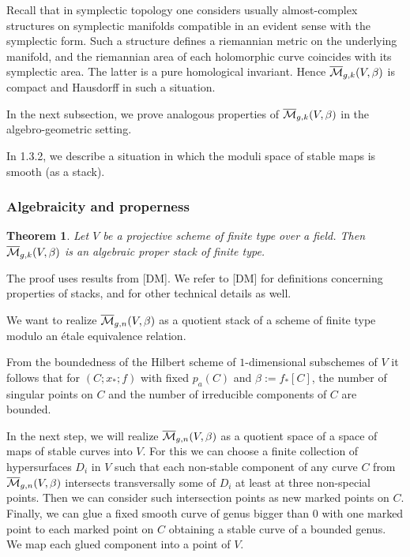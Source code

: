 \documentclass{amsart}
\newtheorem*{thm}{Theorem}
\begin{document}
Recall that in symplectic topology one considers usually
 almost-complex structures on symplectic manifolds compatible in an evident
sense with the symplectic form. Such a structure defines
 a riemannian metric on the underlying manifold, and the riemannian area of
each
 holomorphic curve coincides with its symplectic area. The latter is a pure
homological invariant. Hence $\overline{\mathcal{M}}_{g,k}(V,\beta)$ is compact  and Hausdorff in
such a situation.

In  the next  subsection, we prove analogous properties of $\overline{\mathcal{M}}_{g,k}(V,\beta)$
in the algebro-geometric setting.

In 1.3.2, we describe a situation in which the moduli space of stable maps is
smooth (as a stack).


\subsubsection{Algebraicity and properness}



\begin{thm} Let $V$ be a projective scheme of finite type over a field.
Then
 $\overline{\mathcal{M}}_{g,k}(V,\beta)$ is an algebraic proper stack of finite type.
\end{thm}

The proof uses results from [DM]. We refer to [DM] for definitions  concerning
properties of stacks, and for other technical details as well.

We want to realize $\overline{\mathcal{M}}_{g,n}(V,\beta)$ as a quotient stack of a scheme of
finite type modulo an \'etale equivalence relation.

  From the boundedness of the Hilbert scheme of $1$-dimensional subschemes of
$V$ it follows that for $(C;x_*;f)$ with fixed $p_a(C)$ and $\beta:=f_*[C]$,
the number of singular points on $C$ and the number of irreducible components
of $C$ are bounded.

In the next step, we will realize $\overline{\mathcal{M}}_{g,n}(V,\beta)$ as a quotient space of a
space of maps of stable curves into $V$. For this we can choose a finite
collection of hypersurfaces $D_i$ in $V$ such that each non-stable component of
any curve $C$ from $\overline{\mathcal{M}}_{g,n}(V,\beta)$
 intersects transversally  some of $D_i$ at least at three non-special points.
Then we can consider such intersection points as  new marked points on $C$.
Finally, we can glue a fixed smooth curve of genus bigger than $0$ with one
marked point to each marked point on $C$ obtaining a stable curve of  a bounded
genus. We map each glued  component into a point of $V$.
\end{document}
